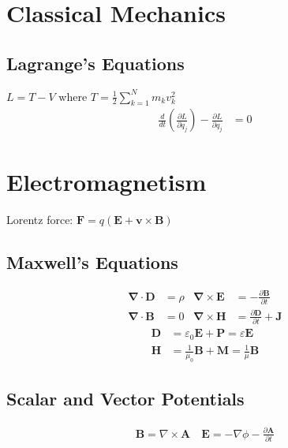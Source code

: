 \documentclass[10pt,twocolumn]{article}
\newcommand{\sigaussian}[2]{#1} %
\newcommand{\D}{\mathbf{\nabla}}
\newcommand{\A}{\mathbf{A}}
\newcommand{\B}{\mathbf{B}}
\newcommand{\E}{\mathbf{E}}
\begin{document}
  \section{Classical Mechanics}
  \subsection*{Lagrange's Equations}
  $L=T-V$ where $T=\frac{1}{2}\sum_{k=1}^Nm_kv_k^2$
  \begin{align*}
  \frac{d}{dt}\left(\frac{\partial L}{\partial\dot{q}_j}\right)-\frac{\partial L}{\partial q_j} &=0
  \end{align*}

  \section{Electromagnetism}
  Lorentz force: $\mathbf{F} = q(\mathbf{E}+\mathbf{v}\times\mathbf{B})$
  \subsection*{Maxwell's Equations}
  \begin{align*}
    \D\cdot\mathbf{D} &= \sigaussian{}{4\pi}\rho &
    \D\times\E &= -\sigaussian{}{\frac1c}\frac{\partial\B}{\partial t} \\
    \D\cdot\B &= 0
    & \D\times\mathbf{H} &=
    \sigaussian{}{\frac1c}\frac{\partial \mathbf{D}}{\partial t}
    + \sigaussian{}{\frac{4\pi}c}\mathbf{J}
  \end{align*}
  \begin{align*}
  \mathbf{D} &= \varepsilon_0\E+\mathbf{P}=\varepsilon\E \\
  \mathbf{H} &= \frac{1}{\mu_0}\mathbf{B} + \mathbf{M}=\frac{1}{\mu}\mathbf{B}
  \end{align*}
  \subsection*{Scalar and Vector Potentials}
  \begin{align*}
  \B=\nabla\times\A \quad \E=-\nabla\phi-\frac{\partial \A}{\partial t}
  \end{align*}
\end{document}

